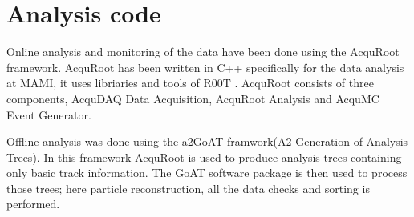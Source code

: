\section{Analysis code}

\indent Online analysis and monitoring of the data have been done using the AcquRoot framework. AcquRoot has been written in C++ specifically for the data analysis at MAMI, it uses libriaries and tools of R00T \cite{john, root}. AcquRoot consists of three components, AcquDAQ Data Acquisition, AcquRoot Analysis and AcquMC Event Generator.

\indent Offline analysis was done using the a2GoAT framwork(A2 Generation of Analysis Trees). In this framework AcquRoot is used to produce analysis trees containing only basic track information. The GoAT software package is then used to process those trees; here particle reconstruction, all the data checks and sorting is performed.
